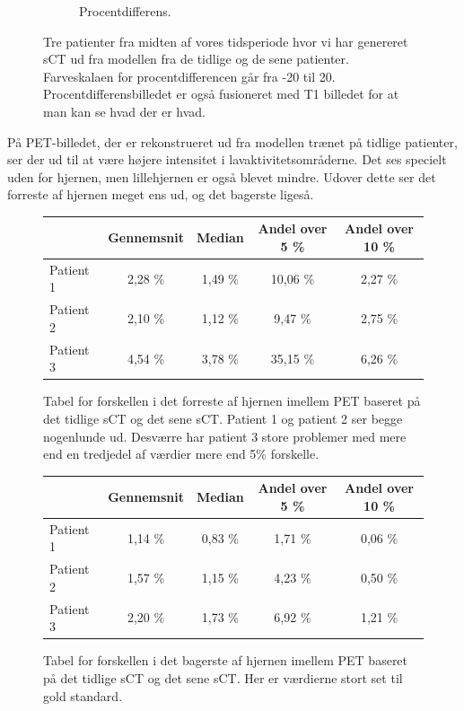 \begin{figure}
\begin{subfigure}{0.3\textwidth}
        \caption{Procentdifferens.}
        \label{col:over_time_pet_pat3_pd}
    \end{subfigure}
    \caption{Tre patienter fra midten af vores tidsperiode hvor vi har genereret sCT ud fra modellen fra de tidlige og de sene patienter. Farveskalaen for procentdifferencen går fra -20 til 20. Procentdifferensbilledet er også fusioneret med T1 billedet for at man kan se hvad der er hvad.}
    \label{col:over_time_pet}
\end{figure}


På PET-billedet, der er rekonstrueret ud fra modellen trænet på tidlige
patienter, ser der ud til at være højere intensitet i
lavaktivitetsområderne. Det ses specielt uden for hjernen, men
lillehjernen er også blevet mindre. Udover dette ser det forreste af
hjernen meget ens ud, og det bagerste ligeså.

\begin{figure}
    \centering
    \begin{tabular}{| l | c | c | c | c |}
        \hline
         & Gennemsnit & Median & Andel over 5 \% & Andel over 10 \% \\ \hline
        Patient 1 & 2,28 \% & 1,49 \% & 10,06 \% & 2,27 \% \\ \hline
        Patient 2 & 2,10 \% & 1,12 \% & 9,47 \% & 2,75 \% \\ \hline
        Patient 3 & 4,54 \% & 3,78 \% & 35,15 \% & 6,26 \% \\ \hline
    \end{tabular}
    \caption{Tabel for forskellen i det forreste af hjernen imellem PET baseret på det tidlige sCT og det sene sCT. Patient 1 og patient 2 ser begge nogenlunde ud. Desværre har patient 3 store problemer med mere end en tredjedel af værdier mere end 5\% forskelle.}
    \label{tab:over_tid_forresthjerne}
\end{figure}

\begin{figure}
    \centering
    \begin{tabular}{| l | c | c | c | c |}
        \hline
         & Gennemsnit & Median & Andel over 5 \% & Andel over 10 \% \\ \hline
        Patient 1 & 1,14 \% & 0,83 \% & 1,71 \% & 0,06 \% \\ \hline
        Patient 2 & 1,57 \% & 1,15 \% & 4,23 \% & 0,50 \% \\ \hline
        Patient 3 & 2,20 \% & 1,73 \% & 6,92 \% & 1,21 \% \\ \hline
    \end{tabular}
    \caption{Tabel for forskellen i det bagerste af hjernen imellem PET baseret på det tidlige sCT og det sene sCT. Her er værdierne stort set til gold standard.}
    \label{tab:over_tid_bagersthjerne}
\end{figure}

